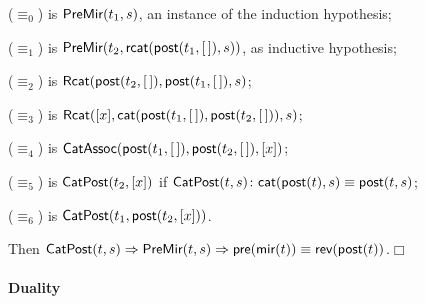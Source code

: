 \begin{itemize*}

  \item (\(\equiv_0\)) is \(\textsf{PreMir}({t_1,s})\), an instance of the
  induction hypothesis;

  \item (\(\equiv_1\)) is
  \(\textsf{PreMir}({t_2,\textsf{rcat}(\textsf{post}(t_1,[\,]),s)})\), as
  inductive hypothesis; 

  \item (\(\equiv_2\)) is
    \(\textsf{Rcat}({\textsf{post}(t_2,[\,]),\textsf{post}(t_1,[\,]),s})\);

  \item (\(\equiv_3\)) is
    \(\textsf{Rcat}({[x],\textsf{cat}(\textsf{post}(t_1,[\,]),
      \textsf{post}(t_2,[\,])),s})\);

  \item (\(\equiv_4\)) is \(\textsf{CatAssoc}({\textsf{post}(t_1,[\,]),
    \textsf{post}(t_2,[\,]),[x]})\);

  \item (\(\equiv_5\)) is
  \(\textsf{CatPost}({t_2,[x]})\) if
  \(\textsf{CatPost}({t,s}) \colon \textsf{cat}(\textsf{post}(t),s) \equiv
  \textsf{post}(t,s)\);

  \item (\(\equiv_6\)) is \(\textsf{CatPost}({t_1,\textsf{post}(t_2,[x])})\).

\end{itemize*}
Then  \(\textsf{CatPost}({t,s}) \Rightarrow
\textsf{PreMir}({t,s}) \Rightarrow \textsf{pre}(\textsf{mir}(t)) \equiv
\textsf{rev}(\textsf{post}(t))\).\hfill\(\Box\)

\paragraph{Duality}
\label{thm:duality}

